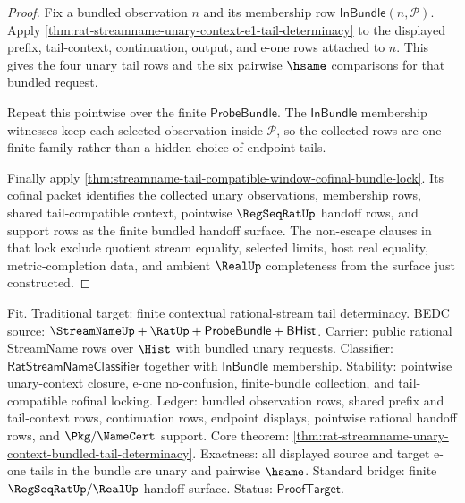 \begin{proof}
Fix a bundled observation $n$ and its membership row
$\mathsf{InBundle}(n,\mathcal P)$. Apply
\autoref{thm:rat-streamname-unary-context-e1-tail-determinacy} to the
displayed prefix, tail-context, continuation, output, and e-one rows attached
to $n$. This gives the four unary tail rows and the six pairwise $\hsame$
comparisons for that bundled request.

Repeat this pointwise over the finite $\mathsf{ProbeBundle}$. The
$\mathsf{InBundle}$ membership witnesses keep each selected observation
inside $\mathcal P$, so the collected rows are one finite family rather than
a hidden choice of endpoint tails.

Finally apply
\autoref{thm:streamname-tail-compatible-window-cofinal-bundle-lock}. Its
cofinal packet identifies the collected unary observations, membership rows,
shared tail-compatible context, pointwise $\RegSeqRatUp$ handoff rows, and
support rows as the finite bundled handoff surface. The non-escape clauses in
that lock exclude quotient stream equality, selected limits, host real
equality, metric-completion data, and ambient $\RealUp$ completeness from the
surface just constructed.
\end{proof}

Fit. Traditional target: finite contextual rational-stream tail determinacy.
BEDC source: $\StreamNameUp+\RatUp+\mathsf{ProbeBundle}+\mathsf{BHist}$.
Carrier: public rational StreamName rows over $\Hist$ with bundled unary
requests. Classifier: $\mathsf{RatStreamNameClassifier}$ together with
$\mathsf{InBundle}$ membership. Stability: pointwise unary-context closure,
e-one no-confusion, finite-bundle collection, and tail-compatible cofinal
locking. Ledger: bundled observation rows, shared prefix and tail-context
rows, continuation rows, endpoint displays, pointwise rational handoff rows,
and $\Pkg/\NameCert$ support. Core theorem:
\autoref{thm:rat-streamname-unary-context-bundled-tail-determinacy}.
Exactness: all displayed source and target e-one tails in the bundle are
unary and pairwise $\hsame$. Standard bridge: finite $\RegSeqRatUp/\RealUp$
handoff surface. Status: $\mathsf{ProofTarget}$.

